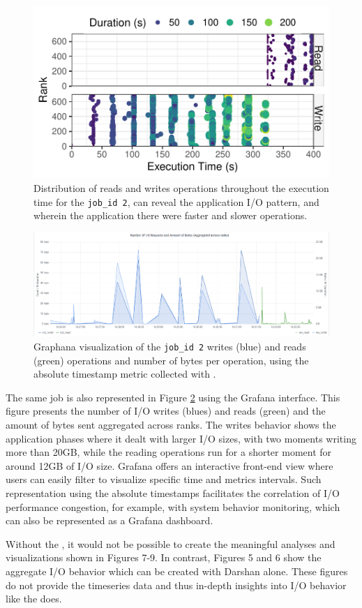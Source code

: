 \begin{figure}
	\centering
	\includegraphics[width=\linewidth]{figs/255653_mpi_io_luster_no_coll_execution2.pdf}
	\caption{Distribution of reads and writes operations
          throughout the execution time for the \texttt{job\_id 2},
          can reveal the application I/O pattern, and wherein the
          application there were faster and slower operations.}
	\label{f:mpi_io}
\end{figure}
\begin{figure}
	\centering
	\includegraphics[width=1\textwidth]{figs/255653_mpi_io_luster_no_coll.pdf}
	\caption{Graphana visualization of the \texttt{job\_id 2}
          writes (blue) and reads (green) operations and number of bytes per
          operation, using the absolute timestamp metric collected
	  with \Darshan{}.}
	  \label{f:mpi_io_grafana}
\end{figure}

The same job is also represented in Figure \ref{f:mpi_io_grafana}
using the Grafana interface. This figure presents the number of I/O
writes (blues) and reads (green) and the amount of bytes sent
aggregated across ranks. The writes behavior shows the application
phases where it dealt with larger I/O sizes, with two moments writing
more than 20GB, while the reading operations run for a shorter moment
for around 12GB of I/O size. Grafana offers an interactive front-end
view where users can easily filter to visualize specific time and
metrics intervals. Such representation using the absolute timestamps
facilitates the correlation of I/O performance congestion, for
example, with system behavior monitoring, which can also be
represented as a Grafana dashboard.

Without the \connector{}, it would not be possible to create the meaningful analyses and visualizations shown in Figures 7-9. In contrast, Figures 5 and 6 show the aggregate I/O behavior which can be created with Darshan alone. These figures do not provide the timeseries data and thus in-depth insights into I/O behavior like the \Darshan{} does.

